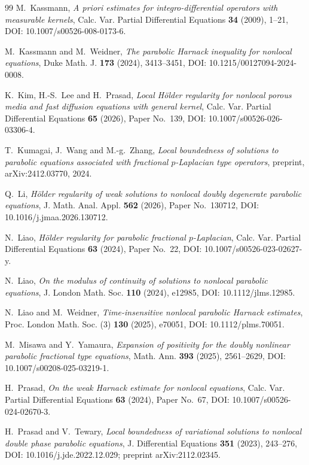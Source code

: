 \documentclass[10pt]{amsart}
\theoremstyle{plain}
\theoremstyle{definition}
\theoremstyle{remark}
\numberwithin{equation}{section}
\begin{document}
\begin{thebibliography}{99}
M.~Kassmann,
\emph{A priori estimates for integro-differential operators with
measurable kernels},
Calc. Var. Partial Differential Equations \textbf{34} (2009), 1--21,
DOI: 10.1007/s00526-008-0173-6.

M.~Kassmann and M.~Weidner,
\emph{The parabolic Harnack inequality for nonlocal equations},
Duke Math. J. \textbf{173} (2024), 3413--3451,
DOI: 10.1215/00127094-2024-0008.

K.~Kim, H.-S.~Lee and H.~Prasad,
\emph{Local H\"older regularity for nonlocal porous media and fast
diffusion equations with general kernel},
Calc. Var. Partial Differential Equations \textbf{65} (2026), Paper No.~139,
DOI: 10.1007/s00526-026-03306-4.

T.~Kumagai, J.~Wang and M.-g.~Zhang,
\emph{Local boundedness of solutions to parabolic equations associated
with fractional $p$-Laplacian type operators},
preprint, arXiv:2412.03770, 2024.

Q.~Li,
\emph{H\"older regularity of weak solutions to nonlocal doubly
degenerate parabolic equations},
J. Math. Anal. Appl. \textbf{562} (2026), Paper No.~130712,
DOI: 10.1016/j.jmaa.2026.130712.

N.~Liao,
\emph{H\"older regularity for parabolic fractional $p$-Laplacian},
Calc. Var. Partial Differential Equations \textbf{63} (2024), Paper No.~22,
DOI: 10.1007/s00526-023-02627-y.

N.~Liao,
\emph{On the modulus of continuity of solutions to nonlocal parabolic
equations},
J. London Math. Soc. \textbf{110} (2024), e12985,
DOI: 10.1112/jlms.12985.

N.~Liao and M.~Weidner,
\emph{Time-insensitive nonlocal parabolic Harnack estimates},
Proc. London Math. Soc. (3) \textbf{130} (2025), e70051,
DOI: 10.1112/plms.70051.

M.~Misawa and Y.~Yamaura,
\emph{Expansion of positivity for the doubly nonlinear parabolic
fractional type equations},
Math. Ann. \textbf{393} (2025), 2561--2629,
DOI: 10.1007/s00208-025-03219-1.

H.~Prasad,
\emph{On the weak Harnack estimate for nonlocal equations},
Calc. Var. Partial Differential Equations \textbf{63} (2024), Paper No.~67,
DOI: 10.1007/s00526-024-02670-3.

H.~Prasad and V.~Tewary,
\emph{Local boundedness of variational solutions to nonlocal double
phase parabolic equations},
J. Differential Equations \textbf{351} (2023), 243--276,
DOI: 10.1016/j.jde.2022.12.029;
preprint arXiv:2112.02345.


\end{thebibliography}
\end{document}
